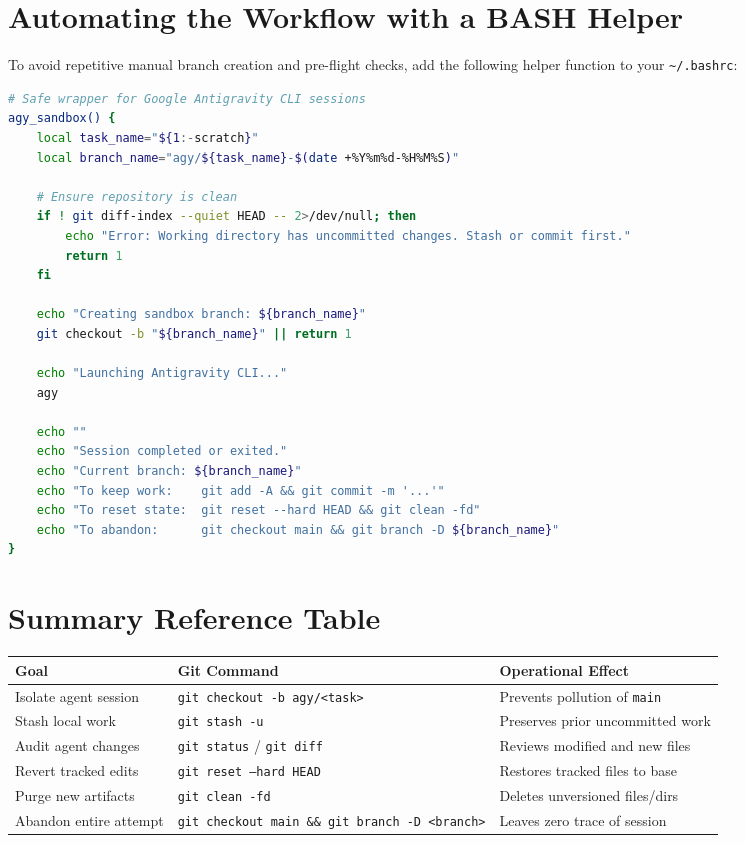 \documentclass[11pt,letterpaper]{article}
\begin{document}
\section{Automating the Workflow with a BASH Helper}

To avoid repetitive manual branch creation and pre-flight checks, add the following helper function to your \texttt{\textasciitilde/.bashrc}:

\begin{lstlisting}[language=bash]
# Safe wrapper for Google Antigravity CLI sessions
agy_sandbox() {
    local task_name="${1:-scratch}"
    local branch_name="agy/${task_name}-$(date +%Y%m%d-%H%M%S)"

    # Ensure repository is clean
    if ! git diff-index --quiet HEAD -- 2>/dev/null; then
        echo "Error: Working directory has uncommitted changes. Stash or commit first."
        return 1
    fi

    echo "Creating sandbox branch: ${branch_name}"
    git checkout -b "${branch_name}" || return 1

    echo "Launching Antigravity CLI..."
    agy

    echo ""
    echo "Session completed or exited."
    echo "Current branch: ${branch_name}"
    echo "To keep work:    git add -A && git commit -m '...'"
    echo "To reset state:  git reset --hard HEAD && git clean -fd"
    echo "To abandon:      git checkout main && git branch -D ${branch_name}"
}
\end{lstlisting}

\section{Summary Reference Table}

\begin{center}
\begin{tabular}{@{}lll@{}}
\toprule
\textbf{Goal} & \textbf{Git Command} & \textbf{Operational Effect} \\ \midrule
Isolate agent session & \texttt{git checkout -b agy/<task>} & Prevents pollution of \texttt{main} \\
Stash local work & \texttt{git stash -u} & Preserves prior uncommitted work \\
Audit agent changes & \texttt{git status} / \texttt{git diff} & Reviews modified and new files \\
Revert tracked edits & \texttt{git reset --hard HEAD} & Restores tracked files to base \\
Purge new artifacts & \texttt{git clean -fd} & Deletes unversioned files/dirs \\
Abandon entire attempt & \texttt{git checkout main \&\& git branch -D <branch>} & Leaves zero trace of session \\ \bottomrule
\end{tabular}
\end{center}
\end{document}
